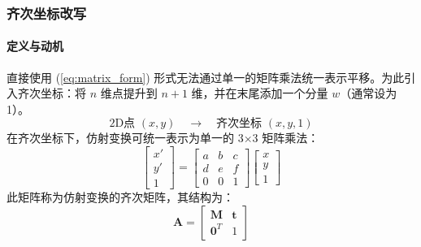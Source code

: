 \documentclass[12pt]{article}
\begin{document}
\subsubsection{齐次坐标改写}

\paragraph{定义与动机}
直接使用 (\ref{eq:matrix_form}) 形式无法通过单一的矩阵乘法统一表示平移。为此引入齐次坐标：将 $n$ 维点提升到 $n+1$ 维，并在末尾添加一个分量 $w$（通常设为 1）。
\[
\text{2D点 } (x, y) \quad \rightarrow \quad \text{齐次坐标 } (x, y, 1)
\]
在齐次坐标下，仿射变换可统一表示为单一的 3×3 矩阵乘法：
\[
\begin{bmatrix} x' \\ y' \\ 1 \end{bmatrix} =
\begin{bmatrix}
    a & b & c \\
    d & e & f \\
    0 & 0 & 1
\end{bmatrix}
\begin{bmatrix} x \\ y \\ 1 \end{bmatrix}
\]
此矩阵称为仿射变换的齐次矩阵，其结构为：
\[
\mathbf{A} = \begin{bmatrix}
    \mathbf{M} & \mathbf{t} \\
    \mathbf{0}^T & 1
\end{bmatrix}
\]
\end{document}
